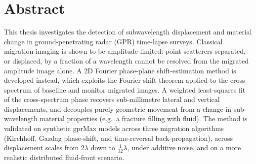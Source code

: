 \chapter*{Abstract}


This thesis investigates the detection of subwavelength displacement and
material change in ground-penetrating radar (GPR) time-lapse surveys. Classical
migration imaging is shown to be amplitude-limited: point scatterers separated,
or displaced, by a fraction of a wavelength cannot be resolved from the migrated
amplitude image alone. A 2D Fourier phase-plane shift-estimation method is
developed instead, which exploits the Fourier shift theorem applied to the
cross-spectrum of baseline and monitor migrated images. A weighted least-squares
fit of the cross-spectrum phase recovers sub-millimetre lateral and vertical
displacements, and decouples purely geometric movement from a change in
sub-wavelength material properties (e.g.\ a fracture filling with fluid). The
method is validated on synthetic gprMax models across three migration
algorithms (Kirchhoff, Gazdag phase-shift, and time-reversal back-propagation),
across displacement scales from $2\lambda$ down to $\tfrac{1}{32}\lambda$, under
additive noise, and on a more realistic distributed fluid-front scenario.
